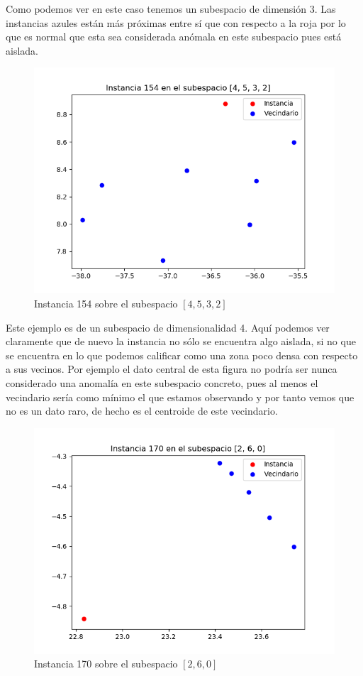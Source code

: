 Como podemos ver en este caso tenemos un subespacio de dimensión 3. Las instancias azules están más próximas entre sí que con respecto a la roja por lo que es normal que esta sea considerada anómala en este subespacio pues está aislada.

\begin{figure}[H]
	\centering
	\label{173_tsne}
	\includegraphics[scale=0.7]{imagenes/173_tsne}
	\caption{Instancia 154 sobre el subespacio $[4,5,3,2]$}
\end{figure}

Este ejemplo es de un subespacio de dimensionalidad 4. Aquí podemos ver claramente que de nuevo la instancia no sólo se encuentra algo aislada, si no que se encuentra en lo que podemos calificar como una zona poco densa con respecto a sus vecinos. Por ejemplo el dato central de esta figura no podría ser nunca considerado una anomalía en este subespacio concreto, pues al menos el vecindario sería como mínimo el que estamos observando y por tanto vemos que no es un dato raro, de hecho es el centroide de este vecindario.

\begin{figure}[H]
	\centering
	\label{190_tsne}
	\includegraphics[scale=0.7]{imagenes/190_tsne}
	\caption{Instancia 170 sobre el subespacio $[2,6,0]$}
\end{figure}

